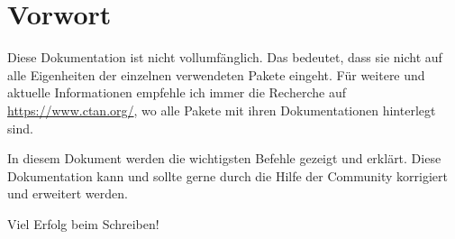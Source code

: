 \chapter{Vorwort}
Diese Dokumentation ist nicht vollumfänglich. Das bedeutet, dass sie nicht auf alle Eigenheiten der einzelnen verwendeten Pakete eingeht. Für weitere und aktuelle Informationen empfehle ich immer die Recherche auf \url{https://www.ctan.org/}, wo alle Pakete mit ihren Dokumentationen hinterlegt sind.

In diesem Dokument werden die wichtigsten Befehle gezeigt und erklärt. Diese Dokumentation kann und sollte gerne durch die Hilfe der Community korrigiert und erweitert werden.

Viel Erfolg beim Schreiben!